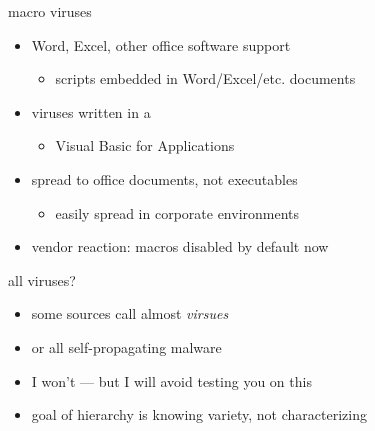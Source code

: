 \begin{frame}{macro viruses}
    \begin{itemize}
    \item Word, Excel, other office software support 
        \begin{itemize}
        \item scripts embedded in Word/Excel/etc. documents
        \end{itemize}
    \item viruses written in a  
        \begin{itemize}
        \item Visual Basic for Applications
        \end{itemize}
    \item spread to office documents, not executables
        \begin{itemize}
        \item easily spread in corporate environments
        \end{itemize}
    \item vendor reaction: macros disabled by default now
    \end{itemize}
\end{frame}

{ %
    \begin{frame}[plain]
    \end{frame}
}

\begin{frame}{all viruses?}
    \begin{itemize}
    \item some sources call almost  \textit{virsues}
    \item or all self-propagating malware
    \vspace{.5cm}
    \item I won't --- but I will avoid testing you on this
    \item goal of hierarchy is knowing variety, not characterizing
    \end{itemize}
\end{frame}

